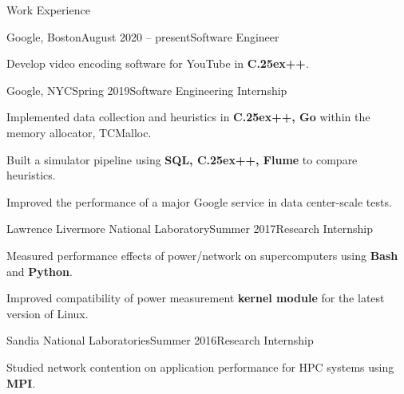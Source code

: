 \documentclass{resume}
\def\bfCplusplus{{\rm{\bf C\raise.25ex\hbox{\small ++}}}}
\begin{document}
\begin{rSection}{Work Experience}

\begin{rWorksection}{Google, Boston}{August 2020 -- present}{Software Engineer}
\item Develop video encoding software for YouTube in {\bf \bfCplusplus{}}.
\end{rWorksection}

\begin{rWorksection}{Google, NYC}{Spring 2019}{Software Engineering
    Internship}
\item Implemented data collection and heuristics in {\bf \bfCplusplus{}, Go} within the memory
  allocator, TCMalloc.
\item Built a simulator pipeline using {\bf SQL, \bfCplusplus{}, Flume} to
  compare heuristics.
\item Improved the performance of a major Google service in data center-scale tests.
\end{rWorksection}

\begin{rWorksection}{Lawrence Livermore National Laboratory}{Summer
    2017}{Research Internship}
\item Measured performance effects of power/network on supercomputers using {\bf
    Bash} and {\bf Python}.
\item Improved compatibility of power measurement {\bf kernel module} for the
  latest version of Linux.
\end{rWorksection}


\begin{rWorksection}{Sandia National Laboratories}{Summer 2016}{Research
    Internship}
\item Studied network contention on application performance for HPC systems
  using {\bf MPI}.
\end{rWorksection}

\end{rSection}
\end{document}
